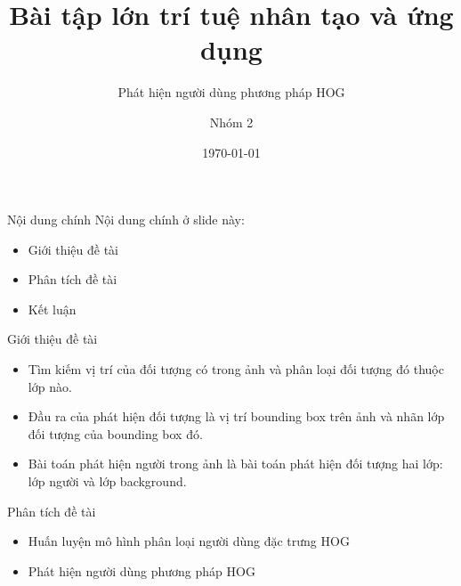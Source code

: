 \documentclass[pdf]{beamer}
\title[Bài tập lớn môn học]{Bài tập lớn trí tuệ nhân tạo và ứng dụng}
\subtitle{Phát hiện người dùng phương pháp HOG}
\theoremstyle{remark}
\theoremstyle{definition}
\begin{document}
\author[Nhóm 2, HUST]{
	\begin{tabular}{c} 
	\Large
	Nhóm 2\\
\end{tabular}
\vspace{-4ex}}


\date{\today}


\begin{frame}\maketitle\end{frame}




\begin{frame}{Nội dung chính}
Nội dung chính ở slide này:
	\begin{itemize}
		\item Giới thiệu đề tài
		\item Phân tích đề tài
		\item Kết luận
	\end{itemize}
\end{frame}



\begin{frame}{Giới thiệu đề tài}
	\begin{itemize}
		\item Tìm kiếm vị trí của đối tượng có trong ảnh và phân loại đối tượng đó thuộc lớp nào.
		\item Đầu ra của phát hiện đối tượng là vị trí bounding box trên ảnh và nhãn lớp đối tượng của bounding box đó.
		\item Bài toán phát hiện người trong ảnh là bài toán phát hiện đối tượng hai lớp: lớp người và lớp background.
	\end{itemize}
\end{frame}

\begin{frame}{Phân tích đề tài}
	\begin{itemize}
		\item Huấn luyện mô hình phân loại người dùng đặc trưng HOG
		\item Phát hiện người dùng phương pháp HOG
	\end{itemize}
\end{frame}
\end{document}
